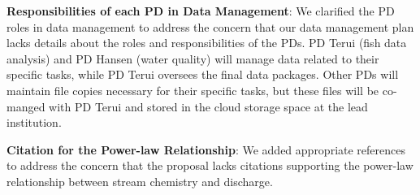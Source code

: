 \documentclass[12pt, class=article, crop=false]{standalone}
\begin{document}
\textbf{Responsibilities of each PD in Data Management}:
We clarified the PD roles in data management to address the concern that our data management plan lacks details about the roles and responsibilities of the PDs.
PD Terui (fish data analysis) and PD Hansen (water quality) will manage data related to their specific tasks, while PD Terui oversees the final data packages.
Other PDs will maintain file copies necessary for their specific tasks, but these files will be co-manged with PD Terui and stored in the cloud storage space at the lead institution.

\textbf{Citation for the Power-law Relationship}:
We added appropriate references to address the concern that the proposal lacks citations supporting the power-law relationship between stream chemistry and discharge.
\end{document}
